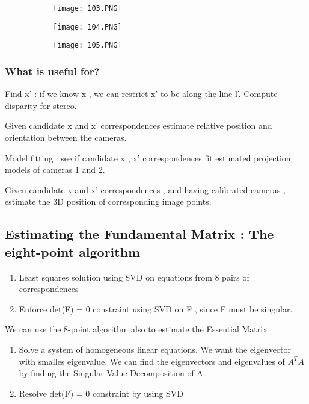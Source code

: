 \documentclass{article}
\begin{document}
\begin{figure}[ht!]
  \centering
  \begin{subfigure}[b]{0.4\linewidth}
    \texttt{[image: 103.PNG]}
  \end{subfigure}
  \begin{subfigure}[b]{0.4\textwidth}
         \centering
         \texttt{[image: 104.PNG]}
     \end{subfigure}
\end{figure}

\begin{figure}[ht!]
  \centering
  \begin{subfigure}[b]{0.4\linewidth}
    \texttt{[image: 105.PNG]}
  \end{subfigure}
\end{figure}

\subsubsection{What is useful for?}

Find x' : if we know x , we can restrict x' to be along the line l'.
Compute disparity for stereo.

Given candidate x and x' correspondences estimate relative position and orientation between the cameras.

Model fitting : see if candidate x , x' correspondences fit estimated projection models of cameras 1 and 2.

Given candidate x and x' correspondences , and having calibrated cameras , estimate the 3D position of corresponding image points.



\subsection{Estimating the Fundamental Matrix : The eight-point algorithm}

\begin{enumerate}
    \item Least squares solution using SVD on equations from 8 pairs of correspondences
    \item Enforce det(F) = 0 constraint using SVD on F , since F must be singular.
\end{enumerate}

We can use the 8-point algorithm also to estimate the Essential Matrix

\begin{enumerate}
    \item Solve a system of homogeneous linear equations. We want the eigenvector with smalles eigenvalue. We can find the eigenvectors and eigenvalues of $A^T A $ by finding the Singular Value Decomposition of A.
    
    \item Resolve det(F) = 0 constraint by using SVD

\end{enumerate}
\end{document}
